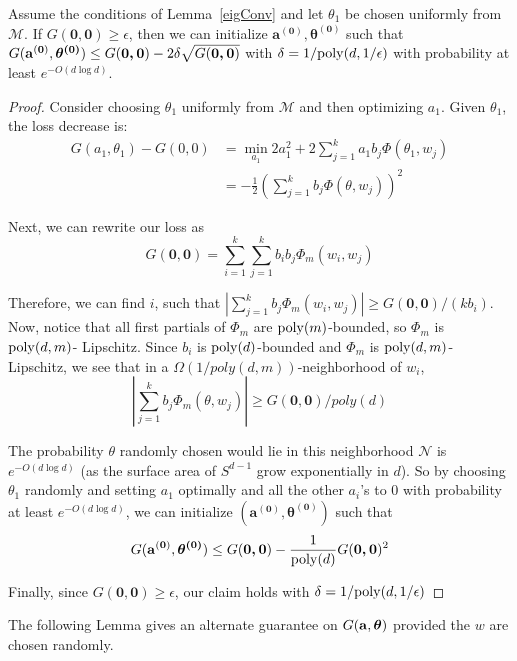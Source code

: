  \begin{lemma}\label{initialize}
Assume the conditions of Lemma~\ref{eigConv} and let $\theta_1$ be chosen uniformly from $\mathcal{M}$. If $G(\boldsymbol{0,0}) \geq \epsilon$, then we can initialize $\boldsymbol{a^{(0)},\theta^{(0)}}$ such that $G({\bf a^{(0)}, \boldsymbol{\theta^{(0)}}}) \leq G(\boldsymbol{0,0}) - 2\delta\sqrt{G(\boldsymbol{0,0})}$ with $\delta = 1/\mathrm{poly}(d,1/\epsilon)$ with probability at least $e^{-O(d \log d)}$.
 \end{lemma}
 
 \begin{proof}
  Consider choosing $\theta_1$ uniformly from $\mathcal{M}$ and then
  optimizing $a_1$. Given $\theta_1$, the loss decrease is:
%
\begin{align*}
   G(a_1,\theta_1) - G(0,0) & = \min_{a_1} 2a_1^2 +
  2\sum_{j=1}^k a_1 b_j\Phi(\theta_1,w_j) \\
 & = -\frac{1}{2}\left(  \sum_{j=1}^k b_j
   \Phi(\theta,w_j)\right)^2 
\end{align*}

Next, we can rewrite our loss as
%
\[G(\boldsymbol{0,0}) =  \sum_{i=1}^k\sum_{j=1}^k b_i b_j \Phi_m(w_i, w_j) \]

Therefore, we can find $i$, such that
$|\sum_{j=1}^k b_j \Phi_m(w_i, w_j)| \geq
G(\boldsymbol{0,0})/(kb_i)$. Now, notice that all first partials of $\Phi_m$ are $\mathrm{poly}(m)$-bounded, so $\Phi_m$ is $\mathrm{poly}(d, m)$- Lipschitz. Since $b_i$ is $\mathrm{poly}(d)$-bounded and $\Phi_m$ is $\mathrm{poly}(d,m)$-Lipschitz, we see
that in a $\Omega(1/poly(d,m))$-neighborhood of $w_i$,
%
\[|\sum_{j=1}^k b_j \Phi_m(\theta, w_j)| \geq G(\boldsymbol{0,0})/poly(d) \]

The probability $\theta$ randomly chosen would lie in this
neighborhood $\mathcal{N}$ is $e^{-O(d \log d)}$ (as the surface area of $S^{d-1}$ grow exponentially in $d$). So by choosing $\theta_1$ randomly and setting $a_1$ optimally and all the other $a_i$'s to $0$ with probability at least $e^{-O(d \log d)}$, we can initialize $(\boldsymbol{a^{(0)},\theta^{(0)}})$ such that 
%
\[G({\bf a^{(0)}, \boldsymbol{\theta^{(0)}}}) \leq G(\boldsymbol{0,0}) - \frac{1}{\mathrm{poly}(d)}G(\boldsymbol{0,0})^2\]

Finally, since $G(\boldsymbol{0,0}) \geq \epsilon$, our claim holds with $\delta = 1/\mathrm{poly}(d,1/\epsilon)$
\end{proof}
%


The following Lemma gives an alternate guarantee on $G({\bf a, \boldsymbol{\theta}})$ provided the $w$ are chosen randomly. 

